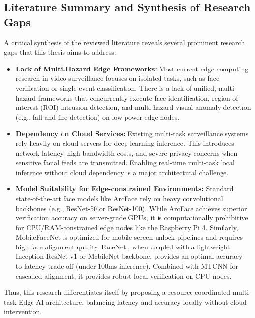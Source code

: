\documentclass[12pt,a4paper]{article}
\begin{document}
\subsection{Literature Summary and Synthesis of Research Gaps}
A critical synthesis of the reviewed literature reveals several prominent research gaps that this thesis aims to address:
\begin{itemize}
    \item \textbf{Lack of Multi-Hazard Edge Frameworks:} Most current edge computing research in video surveillance focuses on isolated tasks, such as face verification or single-event classification. There is a lack of unified, multi-hazard frameworks that concurrently execute face identification, region-of-interest (ROI) intrusion detection, and multi-hazard visual anomaly detection (e.g., fall and fire detection) on low-power edge nodes.
    \item \textbf{Dependency on Cloud Services:} Existing multi-task surveillance systems rely heavily on cloud servers for deep learning inference. This introduces network latency, high bandwidth costs, and severe privacy concerns when sensitive facial feeds are transmitted. Enabling real-time multi-task local inference without cloud dependency is a major architectural challenge.
    \item \textbf{Model Suitability for Edge-constrained Environments:} Standard state-of-the-art face models like ArcFace \cite{arcface_2019} rely on heavy convolutional backbones (e.g., ResNet-50 or ResNet-100). While ArcFace achieves superior verification accuracy on server-grade GPUs, it is computationally prohibitive for CPU/RAM-constrained edge nodes like the Raspberry Pi 4. Similarly, MobileFaceNet is optimized for mobile screen unlock pipelines and requires high face alignment quality. FaceNet \cite{facenet_2015}, when coupled with a lightweight Inception-ResNet-v1 or MobileNet backbone, provides an optimal accuracy-to-latency trade-off (under 100ms inference). Combined with MTCNN for cascaded alignment, it provides robust local verification on CPU nodes.
\end{itemize}
Thus, this research differentiates itself by proposing a resource-coordinated multi-task Edge AI architecture, balancing latency and accuracy locally without cloud intervention.

\newpage

\end{document}
